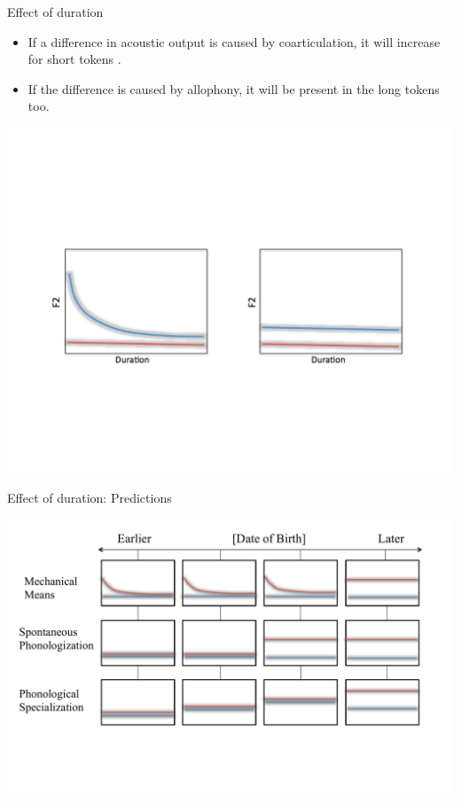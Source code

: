 \documentclass[hyperref={pdfpagelabels=false}]{beamer}
\begin{document}
\begin{frame}{Effect of duration}
	\begin{itemize} 
		\item If a difference in acoustic output is caused by coarticulation, it will increase for short tokens \citep{Strycharczuk2012}.
		\item If the difference is caused by allophony, it will be present in the long tokens too.
	\end{itemize}
	\begin{center}
	\includegraphics[trim=2cm 2cm 2cm 7cm, clip=true, width=1\textwidth]{DurationEx.pdf}
	\end{center}
\end{frame}

\begin{frame}{Effect of duration: Predictions}
	\begin{center}

	\includegraphics[width=1\textwidth]{durpred.pdf}
	\end{center}
\end{frame}
\end{document}
